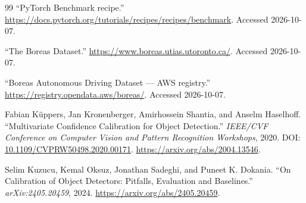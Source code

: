 \documentclass[10pt,twocolumn]{article}
\begin{document}
\begin{thebibliography}{99}
 ``PyTorch Benchmark recipe.'' \url{https://docs.pytorch.org/tutorials/recipes/recipes/benchmark}. Accessed 2026-10-07.

 ``The Boreas Dataset.'' \url{https://www.boreas.utias.utoronto.ca/}. Accessed 2026-10-07.

 ``Boreas Autonomous Driving Dataset --- AWS registry.'' \url{https://registry.opendata.aws/boreas/}. Accessed 2026-10-07.

 Fabian K\"uppers, Jan Kronenberger, Amirhossein Shantia, and Anselm Haselhoff. ``Multivariate Confidence Calibration for Object Detection.'' \textit{IEEE/CVF Conference on Computer Vision and Pattern Recognition Workshops}, 2020. DOI: \href{https://doi.org/10.1109/CVPRW50498.2020.00171}{10.1109/CVPRW50498.2020.00171}. \url{https://arxiv.org/abs/2004.13546}.

 Selim Kuzucu, Kemal Oksuz, Jonathan Sadeghi, and Puneet K. Dokania. ``On Calibration of Object Detectors: Pitfalls, Evaluation and Baselines.'' \textit{arXiv:2405.20459}, 2024. \url{https://arxiv.org/abs/2405.20459}.

\end{thebibliography}
\end{document}
